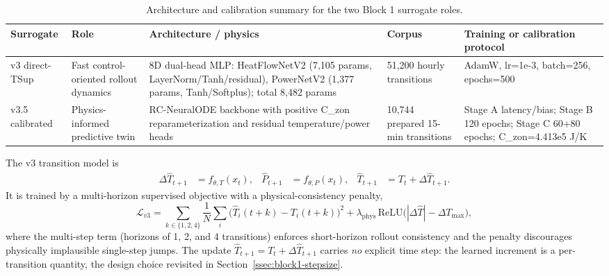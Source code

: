 \documentclass[11pt,a4paper]{article}
\newcommand{\That}{\ensuremath{\widehat{T}}}
\begin{document}
\begin{table}[H]
\centering
\scriptsize
\caption{Architecture and calibration summary for the two Block 1 surrogate roles.}
\label{tab:architecture-summary}
\begin{tabularx}{\linewidth}{lXXXX}
\toprule
Surrogate & Role & Architecture / physics & Corpus & Training or calibration protocol \\
\midrule
v3 direct-TSup & Fast control-oriented rollout dynamics & 8D dual-head MLP: HeatFlowNetV2 (7,105 params, LayerNorm/Tanh/residual), PowerNetV2 (1,377 params, Tanh/Softplus); total 8,482 params & 51,200 hourly transitions & AdamW, lr=1e-3, batch=256, epochs=500 \\
v3.5 calibrated & Physics-informed predictive twin & RC-NeuralODE backbone with positive C\_zon reparameterization and residual temperature/power heads & 10,744 prepared 15-min transitions & Stage A latency/bias; Stage B 120 epochs; Stage C 60+80 epochs; C\_zon=4.413e5 J/K \\
\bottomrule
\end{tabularx}
\end{table}

The v3 transition model is
\begin{align}
  \Delta \That_{t+1} &= f_{\theta,T}(x_t), &
  \widehat{P}_{t+1} &= f_{\theta,P}(x_t), &
  \That_{t+1} &= T_t+\Delta \That_{t+1}.
\end{align}
It is trained by a multi-horizon supervised objective with a physical-consistency penalty,
\begin{equation}
  \mathcal{L}_{v3}
  = \sum_{k\in\{1,2,4\}} \frac{1}{N}\sum_{i}\big(\That_i(t{+}k)-T_i(t{+}k)\big)^2
  + \lambda_{\mathrm{phys}}\,\mathrm{ReLU}\!\big(|\Delta\That|-\Delta T_{\max}\big),
  \label{eq:v3-loss}
\end{equation}
where the multi-step term (horizons of 1, 2, and 4 transitions) enforces short-horizon rollout consistency and the penalty discourages physically implausible single-step jumps. The update \(\That_{t+1}=T_t+\Delta\That_{t+1}\) carries \emph{no} explicit time step: the learned increment is a per-transition quantity, the design choice revisited in Section~\ref{ssec:block1-stepsize}.
\end{document}
